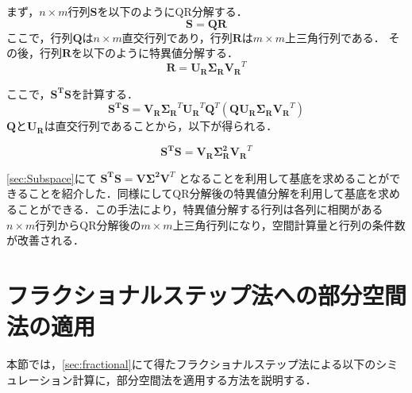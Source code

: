 \documentclass[a4j,12pt]{jreport}
\begin{document}
まず，$n \times m$行列$\bm{S}$を以下のようにQR分解する．
\[
	\bm{S} = \bm{Q}\bm{R}
\]
ここで，行列$\bm{Q}$は$n \times m$直交行列であり，行列$\bm{R}$は$m \times m$上三角行列である．
その後，行列$\bm{R}$を以下のように特異値分解する．
\[
\bm{R} = \bm{U_R} \bm{\Sigma_R} \bm{V_R}^T
\]

ここで，$\bm{S^T}\bm{S}$を計算する．
\[
	\bm{S^T}\bm{S} =  \bm{V_R}  \bm{\Sigma_R}^T \bm{U_R}^T\bm{Q}^T (\bm{Q}\bm{U_R} \bm{\Sigma_R} \bm{V_R}^T)
\]
$\bm{Q}と\bm{U_R}$は直交行列であることから，以下が得られる．

\[
\bm{S^T}\bm{S} = \bm{V_R}\bm{\Sigma_R^2} \bm{V_R}^T
\]

\ref{sec:Subspace}にて
$\bm{S^T}\bm{S} = \bm{V}\bm{\Sigma^2} \bm{V}^T$
となることを利用して基底を求めることができることを紹介した．同様にしてQR分解後の特異値分解を利用して基底を求めることができる．この手法により，特異値分解する行列は各列に相関がある$n \times m$行列からQR分解後の$m \times m$上三角行列になり，空間計算量と行列の条件数が改善される．

\section{フラクショナルステップ法への部分空間法の適用}
本節では，\ref{sec:fractional}にて得たフラクショナルステップ法による以下のシミュレーション計算に，部分空間法を適用する方法を説明する．

\end{document}
